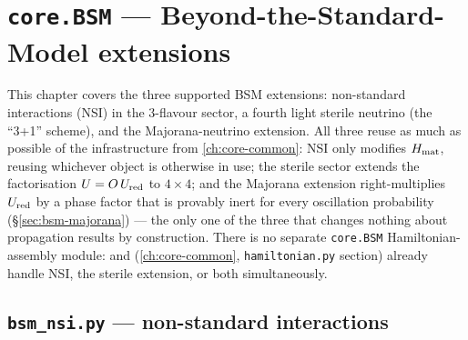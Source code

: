 \chapter{\texttt{core.BSM} --- Beyond-the-Standard-Model extensions}
\label{ch:core-bsm}

This chapter covers the three supported BSM extensions: non-standard
interactions (NSI) in the 3-flavour sector, a fourth light sterile
neutrino (the ``3+1'' scheme), and the Majorana-neutrino extension. All
three reuse as much as possible of the infrastructure from
\cref{ch:core-common}: NSI only modifies $H_{\rm mat}$, reusing whichever
 object is otherwise in use; the sterile sector extends the
factorisation $U=O\,U_{\rm red}$ to $4\times4$; and the Majorana extension
right-multiplies $U_{\rm red}$ by a phase factor that is provably inert for
every oscillation probability (\S\ref{sec:bsm-majorana}) --- the only one
of the three that changes nothing about propagation results by
construction. There is no separate \texttt{core.BSM} Hamiltonian-assembly
module:  and 
(\cref{ch:core-common}, \texttt{hamiltonian.py} section) already handle NSI,
the sterile extension, or both simultaneously.

\section{\texttt{bsm\_nsi.py} --- non-standard interactions}


